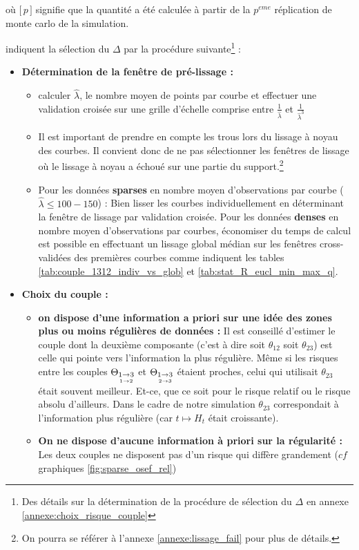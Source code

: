 \smallskip
où $\bigl[\, p \,\bigr]$ signifie que la quantité a été calculée à partir de la $p^{eme}$ réplication de monte carlo de la simulation.

\bigskip

indiquent la sélection du $\Delta$ par la procédure suivante\footnote{Des détails sur la détermination de la procédure de sélection du $\Delta$ en annexe \ref{annexe:choix_risque_couple}} :

\begin{itemize}
	\item \textbf{Détermination de la fenêtre de pré-lissage :}
	\begin{itemize}
		
		\item calculer $\widehat \lambda$, le nombre moyen de points par courbe et effectuer une validation croisée sur une grille d'échelle comprise entre $\displaystyle\frac{1}{\widehat \lambda}$ et $\displaystyle\frac{1}{\widehat \lambda^3}$

		\item Il est important de prendre en compte les \og trous \fg lors du lissage à noyau des courbes. Il convient donc de ne pas sélectionner les fenêtres de lissage où le lissage à noyau a échoué sur une partie du support.\footnote{On pourra se référer à l'annexe \ref{annexe:lissage_fail} pour plus de détails.}

		\item Pour les données \textbf{\og sparses \fg} en nombre moyen d'observations par courbe ($\widehat \lambda \leq  100-150$) : Bien lisser les courbes individuellement en déterminant la fenêtre de lissage par validation croisée. Pour les données \textbf{\og denses \fg} en nombre moyen d'observations par courbes, économiser du temps de calcul est possible en effectuant un lissage global médian sur les fenêtres cross-validées des premières courbes comme indiquent les tables \ref{tab:couple_1312_indiv_vs_glob} et \ref{tab:stat_R_eucl_min_max_q}.
	\end{itemize}


	\bigskip

	\item \textbf{Choix du couple :}

	\begin{itemize}
		\item \textbf{on dispose d'une information a priori sur une idée des zones plus ou moins régulières de données :} Il est conseillé d'estimer le couple dont la deuxième composante (c'est à dire soit $\theta_{12}$ soit $\theta_{23}$) est celle qui pointe vers l'information la plus régulière. Même si les risques entre les couples $\Theta_{\underset{1 \rightarrow 2}{1 \rightarrow 3}}$ et $\Theta_{\underset{2 \rightarrow 3}{1 \rightarrow 3}}$ étaient proches, celui qui utilisait $\theta_{23}$ était souvent meilleur. Et-ce, que ce soit pour le risque relatif ou le risque absolu d'ailleurs. Dans le cadre de notre simulation $\theta_{23}$ correspondait à l'information plus régulière (car $t \mapsto H_t$ était croissante).
		\item \textbf{On ne dispose d'aucune information à priori sur la régularité :} Les deux couples ne disposent pas d'un risque qui diffère grandement ($cf$ graphiques \ref{fig:sparse_osef_rel})
	\end{itemize}


\end{itemize}
